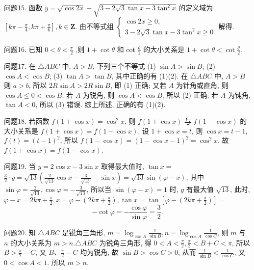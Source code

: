 问题15. 函数 $y=\sqrt{\cos 2 x}+\sqrt{3-2 \sqrt{3} \tan x-3 \tan ^2 x}$ 的定义域为
$\left[k \pi-\frac{\pi}{4}, k \pi+\frac{\pi}{6}\right], k \in \mathbf{Z}$. 由不等式组 $\left\{\begin{array}{l}\cos 2 x \geqslant 0, \\ 3-2 \sqrt{3} \tan x-3 \tan ^2 x \geqslant 0\end{array}\right.$ 解得.



问题16. 已知 $0<\theta<{\frac{\pi}{2}}$ ,则 $1+\cot\theta$ 和 cot $\frac{\theta}{2}$ 的大小关系是
$1+\cot \theta<\cot \frac{\theta}{2}$.



问题17. 在 $\triangle A B C$ 中, $A>B$, 下列三个不等式 (1) $\sin A>\sin B$; (2) $\cos A<\cos B$; (3) $\tan A>\tan B$, 其中正确的有
(1)(2). 在 $\triangle A B C$ 中, $A>B$ 则 $a>b$, 所以 $2 R \sin A>2 R \sin B$, 即 (1) 正确; 又若 $A$ 为针角或直角, 则 $\cos A \leqslant 0<\cos B$; 若 $A$ 为锐角, 则 $\cos A< \cos B$, 所以 (2) 正确; 若 $A$ 为钝角, $\tan A<0$, 所以 (3) 错误.
综上所述, 正确的有 (1)(2).



问题18. 若函数 $f(1+\cos x)=\cos ^2 x$, 则 $f(1+\cos x)$ 与 $f(1-\cos x)$ 的大小关系是
$f(1+\cos x)=f(1-\cos x)$. 设 $1+\cos x=t$, 则 $\cos x=t-1$, $f(t)=(t-1)^2$, 所以 $f(1-\cos x)=(1-\cos x-1)^2=\cos ^2 x$. 故 $f(1+\cos x)= f(1-\cos x)$.



问题19. 当 $y=2 \cos x-3 \sin x$ 取得最大值时, $\tan x=$
$\frac{3}{2} \cdot y=\sqrt{13}\left(\frac{2}{\sqrt{13}} \cos x-\frac{3}{\sqrt{13}}-\sin x\right)=\sqrt{13} \sin (\varphi-x)$, 其中 $\sin \varphi=\frac{2}{\sqrt{13}}, \cos \varphi=-\frac{3}{\sqrt{13}}$, 所以当 $\sin (\varphi-x)=1$ 时, $y$ 有最大值 $\sqrt{13}$, 此时, $\varphi-x=2 k \pi+\frac{\pi}{2}, x=\varphi-\left(2 k \pi+\frac{\pi}{2}\right), \tan x=\tan \left[\varphi-\left(2 k \pi+\frac{\pi}{2}\right)\right]=$
$$
-\cot \varphi=-\frac{\cos \varphi}{\sin \varphi}=\frac{3}{2} .
$$



问题20. 知 $\triangle A B C$ 是锐角三角形, $m=\log _{\cos A} \frac{1}{\sin B}, n=\log _{\cos A} \frac{1}{\cos C}$, 则 $m$ 与 $n$ 的大小关系为
$m>n . \triangle A B C$ 为锐角三角形, 得 $0<A<\frac{\pi}{2}, \frac{\pi}{2}<B+C<\pi$, 所以 $B>\frac{\pi}{2}-C$, 又 $B 、 \frac{\pi}{2}-C$ 均为锐角, 故 $\sin B>\cos C>0$, 从而 $\frac{1}{\sin B}<\frac{1}{\cos C}$, 又 $0<\cos A<1$. 所以 $m>n$.



